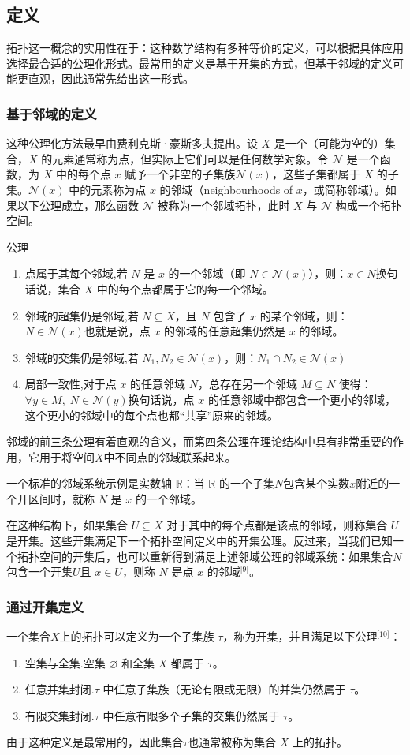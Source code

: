 \subsection{定义}
拓扑这一概念的实用性在于：这种数学结构有多种等价的定义，可以根据具体应用选择最合适的公理化形式。最常用的定义是基于开集的方式，但基于邻域的定义可能更直观，因此通常先给出这一形式。
\subsubsection{基于邻域的定义}
这种公理化方法最早由费利克斯·豪斯多夫提出。设 $X$ 是一个（可能为空的）集合，$X$ 的元素通常称为点，但实际上它们可以是任何数学对象。令 $\mathcal{N}$ 是一个函数，为 $X$ 中的每个点 $x$ 赋予一个非空的子集族$\mathcal{N}(x)$，这些子集都属于 $X$ 的子集。$\mathcal{N}(x)$ 中的元素称为点 $x$ 的邻域（neighbourhoods of $x$，或简称邻域）。如果以下公理成立，那么函数 $\mathcal{N}$ 被称为一个邻域拓扑，此时 $X$ 与 $\mathcal{N}$ 构成一个拓扑空间。

公理
\begin{enumerate}
\item 点属于其每个邻域,若 $N$ 是 $x$ 的一个邻域（即 $N \in \mathcal{N}(x)$），则：$x \in N$换句话说，集合 $X$ 中的每个点都属于它的每一个邻域。
\item 邻域的超集仍是邻域,若 $N \subseteq X$，且 $N$ 包含了 $x$ 的某个邻域，则：$N \in \mathcal{N}(x)$也就是说，点 $x$ 的邻域的任意超集仍然是 $x$ 的邻域。
\item 邻域的交集仍是邻域,若 $N_1, N_2 \in \mathcal{N}(x)$，则：$N_1 \cap N_2 \in \mathcal{N}(x)$
\item 局部一致性,对于点 $x$ 的任意邻域 $N$，总存在另一个邻域 $M \subseteq N$ 使得：$\forall y \in M, \; N \in \mathcal{N}(y)$换句话说，点 $x$ 的任意邻域中都包含一个更小的邻域，这个更小的邻域中的每个点也都“共享”原来的邻域。
\end{enumerate}
邻域的前三条公理有着直观的含义，而第四条公理在理论结构中具有非常重要的作用，它用于将空间$X$中不同点的邻域联系起来。

一个标准的邻域系统示例是实数轴 $\mathbb{R}$：当 $\mathbb{R}$ 的一个子集$N$包含某个实数$x$附近的一个开区间时，就称 $N$ 是 $x$ 的一个邻域。

在这种结构下，如果集合 $U \subseteq X$ 对于其中的每个点都是该点的邻域，则称集合 $U$ 是开集。这些开集满足下一个拓扑空间定义中的开集公理。反过来，当我们已知一个拓扑空间的开集后，也可以重新得到满足上述邻域公理的邻域系统：如果集合$N$包含一个开集$U$且 $x \in U$，则称 $N$ 是点 $x$ 的邻域\(^\text{[9]}\)。
\subsubsection{通过开集定义}
一个集合$X$上的拓扑可以定义为一个子集族 $\tau$，称为开集，并且满足以下公理\(^\text{[10]}\)：
\begin{enumerate}
\item 空集与全集.空集 $\varnothing$ 和全集 $X$ 都属于 $\tau$。
\item 任意并集封闭.$\tau$ 中任意子集族（无论有限或无限）的并集仍然属于 $\tau$。
\item 有限交集封闭.$\tau$ 中任意有限多个子集的交集仍然属于 $\tau$。
\end{enumerate}
由于这种定义是最常用的，因此集合$\tau$也通常被称为集合 $X$ 上的拓扑。

